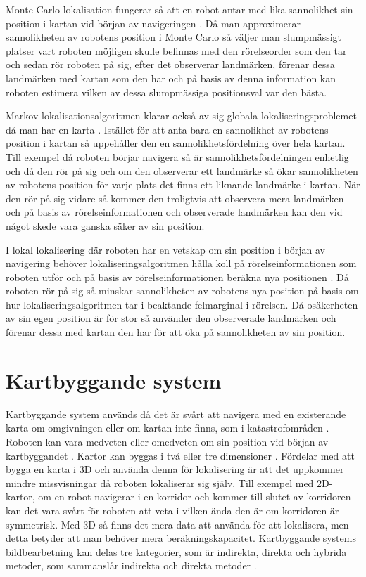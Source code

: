 Monte Carlo lokalisation fungerar så att en robot antar med lika sannolikhet sin position i kartan vid början av navigeringen \citep{montecarlo}. Då man approximerar sannolikheten av robotens position i Monte Carlo så väljer man slumpmässigt platser vart roboten möjligen skulle befinnas med den rörelseorder som den tar och sedan rör roboten på sig, efter det observerar landmärken, förenar dessa landmärken med kartan som den har och på basis av denna information kan roboten estimera vilken av dessa slumpmässiga positionsval var den bästa. 

Markov lokalisationsalgoritmen klarar också av sig globala lokaliseringsproblemet då man har en karta \citep{ProbabilisticRobotics}. Istället för att anta bara en sannolikhet av robotens position i kartan så uppehåller den en sannolikhetsfördelning över hela kartan. Till exempel då roboten börjar navigera så är sannolikhetsfördelningen enhetlig och då den rör på sig och om den observerar ett landmärke så ökar sannolikheten av robotens position för varje plats det finns ett liknande landmärke i kartan. När den rör på sig vidare så kommer den troligtvis att observera mera landmärken och på basis av rörelseinformationen och observerade landmärken kan den vid något skede vara ganska säker av sin position.

I lokal lokalisering där roboten har en vetskap om sin position i början av navigering behöver lokaliseringsalgoritmen hålla koll på rörelseinformationen som roboten utför och på basis av rörelseinformationen beräkna nya positionen \citep{montecarlo,ProbabilisticRobotics}. Då roboten rör på sig så minskar sannolikheten av robotens nya position på basis om hur lokaliseringsalgoritmen tar i beaktande felmarginal i rörelsen. Då osäkerheten av sin egen position är för stor så använder den observerade landmärken och förenar dessa med kartan den har för att öka på sannolikheten av sin position. 

\section{Kartbyggande system}

Kartbyggande system används då det är svårt att navigera med en existerande karta om omgivningen eller om kartan inte finns, som i katastrofområden \citep{geospatial}. Roboten kan vara medveten eller omedveten om sin position vid början av kartbyggandet \citep{globalsubmaps}. Kartor kan byggas i två eller tre dimensioner \citep{ProbabilisticRobotics}. Fördelar med att bygga en karta i 3D och använda denna för lokalisering är att det uppkommer mindre missvisningar då roboten lokaliserar sig själv. Till exempel med 2D-kartor, om en robot navigerar i en korridor och kommer till slutet av korridoren kan det vara svårt för roboten att veta i vilken ända den är om korridoren är symmetrisk. Med 3D så finns det mera data att använda för att lokalisera, men detta betyder att man behöver mera beräkningskapacitet. Kartbyggande systems bildbearbetning kan delas tre kategorier, som är indirekta, direkta och hybrida metoder, som sammanslår indirekta och direkta metoder \citep{geospatial}.

